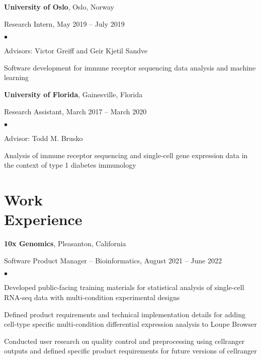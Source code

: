 \documentclass[margin,centered]{res}
\newenvironment{list1}{
  \begin{list}{\ding{113}}{%
      \setlength{\itemsep}{0in}
      \setlength{\parsep}{0in} \setlength{\parskip}{0in}
      \setlength{\topsep}{0in} \setlength{\partopsep}{0in}
      \setlength{\leftmargin}{0.17in}}}{\end{list}}
\newenvironment{list2}{
  \begin{list}{$\bullet$}{%
      \setlength{\itemsep}{0in}
      \setlength{\parsep}{0in} \setlength{\parskip}{0in}
      \setlength{\topsep}{0in} \setlength{\partopsep}{0in}
      \setlength{\leftmargin}{0.2in}}}{\end{list}}
\begin{document}
\begin{resume}
{\bf University of Oslo}, Oslo, Norway
\begin{list1}
\item[] 
Research Intern, May 2019 -- July 2019
\begin{list2}
\item Advisors: Victor Greiff and Geir Kjetil Sandve
\item Software development for immune receptor sequencing data analysis and machine learning
\end{list2} 
\end{list1}
\vspace*{-.1in}
{\bf University of Florida},  Gainesville, Florida
\begin{list1}
\item[] 
Research Assistant, March 2017 -- March 2020
\begin{list2}
\item Advisor: Todd M. Brusko
\item Analysis of immune receptor sequencing and single-cell gene expression data in the context of type 1 diabetes immunology
\end{list2} 
\end{list1}

\section{\sc Work\\ Experience}
{\bf 10x Genomics},  Pleasanton, California
\begin{list1}
\item[] 
Software Product Manager -- Bioinformatics, August 2021 -- June 2022
\begin{list2}
\item Developed public-facing training materials for statistical analysis of single-cell RNA-seq data with multi-condition experimental designs
\item Defined product requirements and technical implementation details for adding cell-type specific multi-condition differential expression analysis to Loupe Browser
\item Conducted user research on quality control and preprocessing using cellranger outputs and defined specific product requirements for future versions of cellranger
\end{list2}
\end{list1}


\end{resume}
\end{document}
